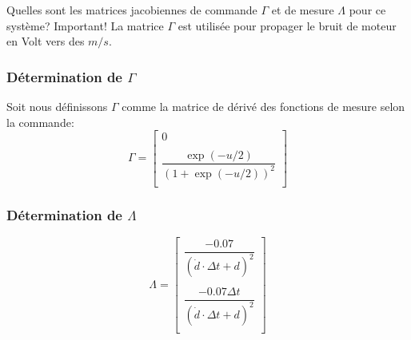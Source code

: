 \documentclass[12pt]{article}
\begin{document}
Quelles sont les matrices jacobiennes de commande $\Gamma$ et de mesure $\Lambda$ pour ce système? Important! La matrice $\Gamma$ est utilisée pour propager le bruit de moteur en Volt vers des $m/s$.

\subsubsection{Détermination de $\Gamma$}
Soit nous définissons $\Gamma$ comme la matrice de dérivé des fonctions de mesure selon la commande:
\begin{equation}
\Gamma =
\begin{bmatrix}
    0   \\
    \\
    \dfrac{\exp(-u/2)}{(1+\exp(-u/2))^2} \\
\end{bmatrix}
\end{equation}

\subsubsection{Détermination de $\Lambda$}
\begin{equation}
\Lambda =
\begin{bmatrix}
    \dfrac{-0.07}{(\dot{d} \cdot \Delta t + d )^2}   \\
    \\
    \dfrac{-0.07 \Delta t}{(\dot{d} \cdot \Delta t + d )^2}   \\
\end{bmatrix}
\end{equation}
\end{document}
